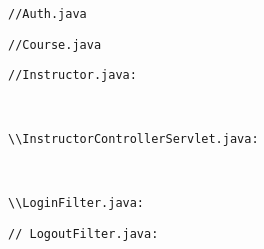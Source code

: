 \small
\lstset{basicstyle=\ttfamily,breaklines=true}
\begin{lstlisting}
//Auth.java

\end{lstlisting}

\begin{lstlisting}
//Course.java

\end{lstlisting}

\begin{lstlisting}
//Instructor.java:



\end{lstlisting}

\begin{lstlisting}
\\InstructorControllerServlet.java:



\end{lstlisting}

\begin{lstlisting}
\\LoginFilter.java:

\end{lstlisting}

\begin{lstlisting}
// LogoutFilter.java:

\end{lstlisting}